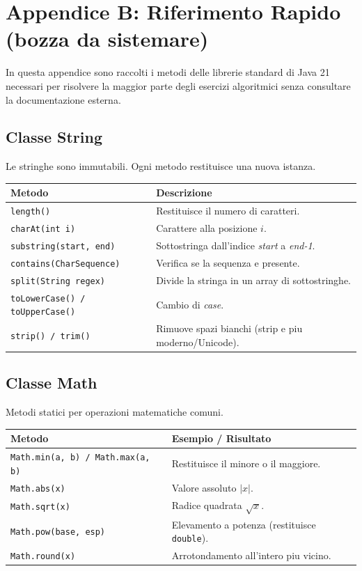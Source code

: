 \chapter{Appendice B: Riferimento Rapido (bozza da sistemare)}

In questa appendice sono raccolti i metodi delle librerie standard di Java 21 necessari per risolvere la maggior parte degli esercizi algoritmici senza consultare la documentazione esterna.

\section{Classe String}
Le stringhe sono immutabili. Ogni metodo restituisce una nuova istanza.

\begin{table}[ht!]
\centering
\begin{tabularx}{\textwidth}{@{}lX@{}}
\toprule
\textbf{Metodo} & \textbf{Descrizione} \\ \midrule
\texttt{length()} & Restituisce il numero di caratteri. \\
\texttt{charAt(int i)} & Carattere alla posizione $i$. \\
\texttt{substring(start, end)} & Sottostringa dall'indice \textit{start} a \textit{end-1}. \\
\texttt{contains(CharSequence)} & Verifica se la sequenza e presente. \\
\texttt{split(String regex)} & Divide la stringa in un array di sottostringhe. \\
\texttt{toLowerCase() / toUpperCase()} & Cambio di \textit{case}. \\
\texttt{strip() / trim()} & Rimuove spazi bianchi (strip e piu moderno/Unicode). \\ \bottomrule
\end{tabularx}
\end{table}

\section{Classe Math}
Metodi statici per operazioni matematiche comuni.

\begin{table}[ht!]
\centering
\begin{tabularx}{\textwidth}{@{}lX@{}}
\toprule
\textbf{Metodo} & \textbf{Esempio / Risultato} \\ \midrule
\texttt{Math.min(a, b) / Math.max(a, b)} & Restituisce il minore o il maggiore. \\
\texttt{Math.abs(x)} & Valore assoluto $|x|$. \\
\texttt{Math.sqrt(x)} & Radice quadrata $\sqrt{x}$. \\
\texttt{Math.pow(base, esp)} & Elevamento a potenza (restituisce \texttt{double}). \\
\texttt{Math.round(x)} & Arrotondamento all'intero piu vicino. \\ \bottomrule
\end{tabularx}
\end{table}

